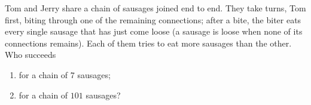 Tom and Jerry share a chain of sausages joined end to end. They take turns, Tom first, biting through one of the remaining connections; after a bite, the biter eats every single sausage that has just come loose (a sausage is loose when none of its connections remains). Each of them tries to eat more sausages than the other. Who succeeds
\begin{enumerate}
\item[(a)] for a chain of $7$ sausages;
\item[(b)] for a chain of $101$ sausages?
\end{enumerate}
